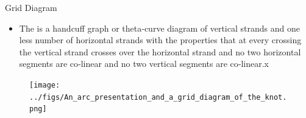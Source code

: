 \begin{frame}{Grid Diagram}
	\begin{itemize}
		\item The  is a handcuff graph or theta‐curve diagram of vertical strands and one less number of horizontal strands with the properties that at every crossing the vertical strand crosses over the horizontal strand and no two horizontal segments are co‐linear and no two vertical segments are co‐linear.x
	\end{itemize}
\begin{figure}
    \centerline{\texttt{[image: ../figs/An\_arc\_presentation\_and\_a\_grid\_diagram\_of\_the\_knot.png]}}
\end{figure}
\end{frame}




